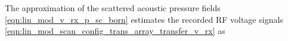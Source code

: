 The  approximation of
the scattered acoustic pressure fields
\eqref{eqn:lin_mod_v_rx_p_sc_born} estimates
the recorded \ac{RF} voltage signals
\eqref{eqn:lin_mod_scan_config_trans_array_transfer_v_rx} as
